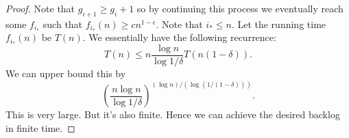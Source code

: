\documentclass[twocolumn]{article}[11pt]
\renewcommand{\paragraph}[1]{\vspace{0.09in}\noindent{\bf \boldmath #1.}}
\DeclareMathOperator{\poly}{\text{poly}}
\begin{document}
\begin{proof}
  Note that $g_{i+1} \ge g_i + 1$ so by continuing this process we eventually
  reach some $f_{i_*}$ such that $f_{i_*}(n) \ge cn^{1-\epsilon}$.
  Note that $i_* \le n$.
  Let the running time $f_{i_*}(n)$ be $T(n)$.
  We essentially have the following recurrence:
  $$T(n) \le n\frac{\log n}{\log 1/\delta}T(n(1-\delta)).$$
  We can upper bound this by
  $$\left(\frac{n\log n}{\log 1/\delta}\right)^{(\log n)/(\log (1/(1-\delta)))}.$$
  This is very large. But it's also finite. Hence we can achieve the desired backlog in finite time.



\end{proof}
\end{document}
